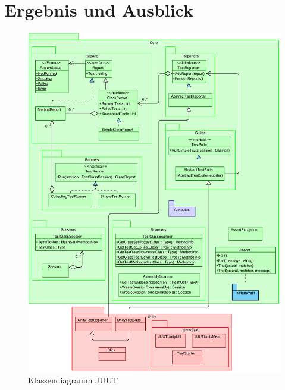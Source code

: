 \chapter{Ergebnis und Ausblick}

\clearpage
\begin{figure}
\centering
\includegraphics[width=0.9\linewidth]{images/Kapitel_Ergebnis/Overview}
\caption[Klassendiagramm JUUT]{Klassendiagramm JUUT}
\label{fig:Overview}
\end{figure}
